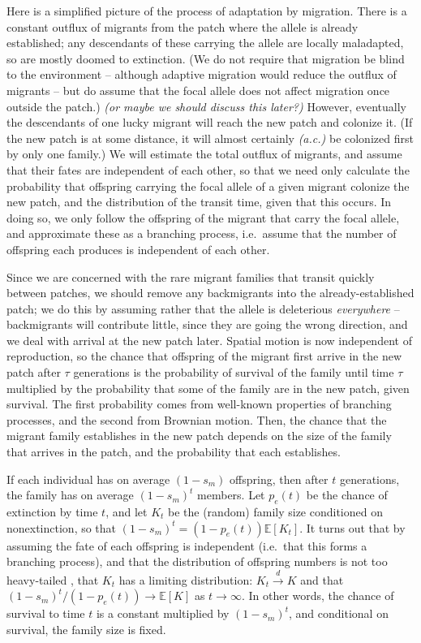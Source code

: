\documentclass{article}
\newcommand{\E}{\mathbb{E}}
\newcommand{\dconv}{\xrightarrow{d}}
\newcommand{\plr}[1]{{\it\color{blue}(#1)}}
\begin{document}
Here is a simplified picture of the process of adaptation by migration.
There is a constant outflux of migrants from the patch where the allele is already established; 
any descendants of these carrying the allele are locally maladapted, so are mostly doomed to extinction.
(We do not require that migration be blind to the environment --
although adaptive migration would reduce the outflux of migrants --
but do assume that the focal allele does not affect migration once outside the patch.)
\plr{or maybe we should discuss this later?}
However, eventually the descendants of one lucky migrant will reach the new patch and colonize it.
(If the new patch is at some distance, it will almost certainly \plr{a.c.} be colonized first by only one family.)
We will estimate the total outflux of migrants, and assume that their fates are independent of each other,
so that we need only calculate the probability that offspring carrying the focal allele of a given migrant colonize the new patch,
and the distribution of the transit time, given that this occurs.
In doing so, we only follow the offspring of the migrant that carry the focal allele,
and approximate these as a branching process, 
i.e.\ assume that the number of offspring each produces is independent of each other.

Since we are concerned with the rare migrant families that transit quickly between patches, 
we should remove any backmigrants into the already-established patch;
we do this by assuming rather that the allele is deleterious \emph{everywhere} --
backmigrants will contribute little, since they are going the wrong direction,
and we deal with arrival at the new patch later.
Spatial motion is now independent of reproduction,
so the chance that offspring of the migrant first arrive in the new patch after $\tau$ generations 
is the probability of survival of the family until time $\tau$
multiplied by the probability that some of the family are in the new patch, given survival.
The first probability comes from well-known properties of branching processes,
and the second from Brownian motion.
Then, the chance that the migrant family establishes in the new patch 
depends on the size of the family that arrives in the patch,
and the probability that each establishes.

If each individual has on average $(1-s_m)$ offspring, then after $t$ generations,
the family has on average $(1-s_m)^t$ members.
Let $p_e(t)$ be the chance of extinction by time $t$, and let $K_t$ be the (random) family size conditioned on nonextinction,
so that $(1-s_m)^t = (1-p_e(t))\E[K_t]$.
It turns out that by assuming the fate of each offspring is independent (i.e.\ that this forms a branching process),
and that the distribution of offspring numbers is not too heavy-tailed \citep[see][for details]{jaegers1976branching},
that $K_t$ has a limiting distribution: $K_t \dconv K$ 
and that $(1-s_m)^{t}/(1-p_e(t)) \to \E[K]$ as $t \to \infty$.
In other words, the chance of survival to time $t$ is a constant multiplied by $(1-s_m)^t$,
and conditional on survival, the family size is fixed.
\end{document}
